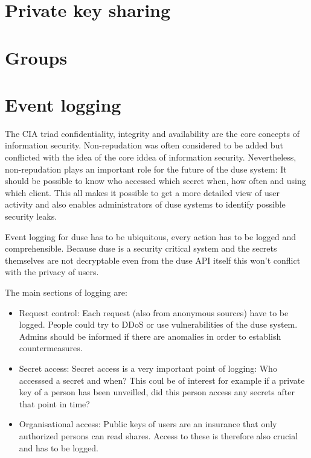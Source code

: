 \section{Private key sharing}
\section{Groups}

\section{Event logging}

The CIA triad confidentiality, integrity and availability are the core
concepts of information security. Non-repudation was often considered
to be added but conflicted with the idea of the core iddea of information
security. Nevertheless, non-repudation plays an important role for the
future of the duse system: It should be possible to know who accessed
which secret when, how often and using which client. This all makes it
possible to get a more detailed view of user activity and also enables
administrators of duse systems to identify possible security leaks.

Event logging for duse has to be ubiquitous, every action has to be
logged and comprehensible. Because duse is a security critical system
and the secrets themselves are not decryptable even from the duse API
itself this won't conflict with the privacy of users.

The main sections of logging are:
\begin{itemize}
  \item Request control: Each request (also from anonymous sources) have
  to be logged. People could try to DDoS or use vulnerabilities of the
  duse system. Admins should be informed if there are anomalies in order
  to establish countermeasures.

  \item Secret access: Secret access is a very important point of logging:
  Who accesssed a secret and when? This coul be of interest for example if
  a private key of a person has been unveilled, did this person access any
  secrets after that point in time?

  \item Organisational access: Public keys of users are an insurance that
  only authorized persons can read shares. Access to these is therefore
  also crucial and has to be logged.
\end{itemize}

